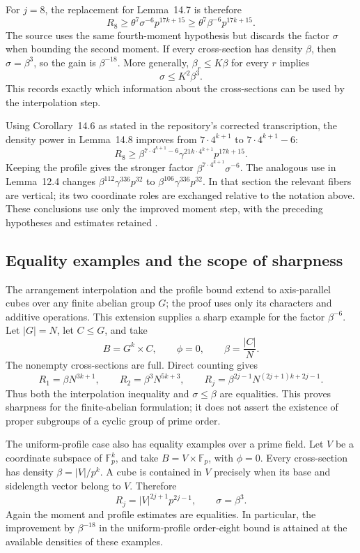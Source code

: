 \documentclass[11pt,letterpaper]{article}
\numberwithin{equation}{section}
\theoremstyle{definition}
\theoremstyle{remark}
\newcommand{\F}{\mathbb F}
\newcommand{\1}{\mathbf 1}
\newcommand{\abs}[1]{\left|#1\right|}
\begin{document}
For \(j=8\), the replacement for Lemma~14.7 is therefore
\[
 R_8\geq\theta^7\sigma^{-6}p^{17k+15}
       \geq\theta^7\beta^{-6}p^{17k+15}.
 \tag{A10}
\]
The source uses the same fourth-moment hypothesis but discards
the factor \(\sigma\) when bounding the second moment.
If every cross-section has density \(\beta\), then
\(\sigma=\beta^3\), so the gain is \(\beta^{-18}\).
More generally, \(\beta_r\leq K\beta\) for every \(r\)
implies
\[
 \sigma\leq K^2\beta^3.
 \tag{A11}
\]
This records exactly which information about the cross-sections
can be used by the interpolation step.

Using Corollary~14.6 as stated in the repository's corrected
transcription, the density power in Lemma~14.8 improves from
\(7\cdot4^{k+1}\) to \(7\cdot4^{k+1}-6\):
\[
 R_8\geq
 \beta^{7\cdot4^{k+1}-6}
 \gamma^{21k\cdot4^{k+1}}p^{17k+15}.
 \tag{A12}
\]
Keeping the profile gives the stronger factor
\(\beta^{7\cdot4^{k+1}}\sigma^{-6}\).
The analogous use in Lemma~12.4 changes
\(\beta^{112}\gamma^{336}p^{32}\) to
\(\beta^{106}\gamma^{336}p^{32}\).
In that section the relevant fibers are vertical; its two
coordinate roles are exchanged relative to the notation above.
These conclusions use only the improved moment step, with the
preceding hypotheses and estimates retained
\cite{gowers,repo04}.

\subsection{Equality examples and the scope of sharpness}

The arrangement interpolation and the profile bound extend to
axis-parallel cubes over any finite abelian group \(G\); the
proof uses only its characters and additive operations.
This extension supplies a sharp example for the factor
\(\beta^{-6}\).  Let \(\abs G=N\), let \(C\leq G\), and take
\[
 B=G^k\times C,\qquad \phi=0,\qquad \beta=\frac{\abs C}{N}.
\]
The nonempty cross-sections are full.  Direct counting gives
\[
 R_1=\beta N^{3k+1},\qquad
 R_2=\beta^3N^{5k+3},\qquad
 R_j=\beta^{2j-1}N^{(2j+1)k+2j-1}.
 \tag{A13}
\]
Thus both the interpolation inequality and
\(\sigma\leq\beta\) are equalities.  This proves sharpness
for the finite-abelian formulation; it does not assert the
existence of proper subgroups of a cyclic group of prime order.

The uniform-profile case also has equality examples over a
prime field.  Let \(V\) be a coordinate subspace of \(\F_p^k\),
and take \(B=V\times\F_p\), with \(\phi=0\).
Every cross-section has density
\(\beta=\abs V/p^k\).  A cube is contained in \(V\) precisely
when its base and sidelength vector belong to \(V\).  Therefore
\[
 R_j=\abs V^{2j+1}p^{2j-1},\qquad
 \sigma=\beta^3.
 \tag{A14}
\]
Again the moment and profile estimates are equalities.
In particular, the improvement by \(\beta^{-18}\) in the
uniform-profile order-eight bound is attained at the available
densities of these examples.
\end{document}
